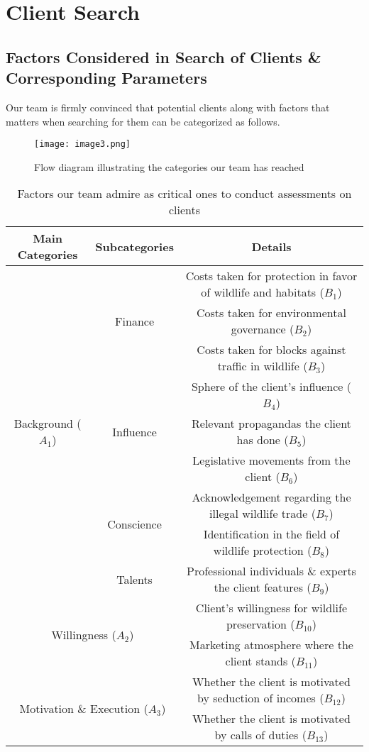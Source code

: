 \documentclass[12pt]{article}
\begin{document}
\section{Client Search}

\subsection{Factors Considered in Search of Clients \& Corresponding Parameters}
Our team is firmly convinced that potential clients along with factors that matters when searching for them can be categorized as follows.
\begin{figure}[htbp]
\centering
\texttt{[image: image3.png]}
\caption{Flow diagram illustrating the categories our team has reached}
\end{figure}

\begin{table}[htbp]
\begin{tabular}{||c|c|c||}
\hline
\hline
	Main Categories & Subcategories & Details\\
	\hline
	\multirow{9}{*}{Background ($A_1$)} & \multirow{3}{*}{Finance} & Costs taken for protection in favor of wildlife and habitats ($B_1$)\\
	
	&&Costs taken for environmental governance ($B_2$)\\
	&&Costs taken for blocks against traffic in wildlife ($B_3$)\\
	\cline{2-3}
	&\multirow{3}{*}{Influence}&Sphere of the client's influence ($B_4$)\\
	&&Relevant propagandas the client has done ($B_5$)\\
	&&Legislative movements from the client ($B_6$)\\
	\cline{2-3}
	&\multirow{2}{*}{Conscience}&Acknowledgement regarding the illegal wildlife trade ($B_7$)\\
	&&Identification in the field of wildlife protection ($B_8$)\\
	\cline{2-3}
	&Talents & Professional individuals \& experts the client features ($B_9$)\\
	\hline
	\multicolumn{2}{||c|}{\multirow{2}{*}{Willingness ($A_2$)}} & Client's willingness for wildlife preservation ($B_{10}$)\\
	\multicolumn{2}{||c|}{}& Marketing atmosphere where the client stands ($B_{11}$)\\
	\hline
	\multicolumn{2}{||c|}{\multirow{2}{*}{Motivation \& Execution ($A_3$)}} & Whether the client is motivated by seduction of incomes ($B_{12}$) \\
	\multicolumn{2}{||c|}{}& Whether the client is motivated by calls of duties ($B_{13}$)\\
	\hline
	\hline
	\end{tabular}
	\caption{Factors our team admire as critical ones to conduct assessments on clients}
\end{table}
\end{document}
